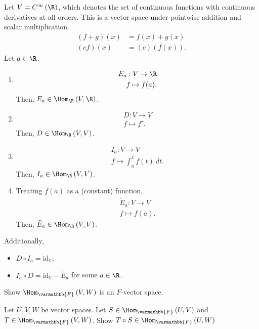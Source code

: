 \documentclass[10pt]{mypackage}
\renewcommand*{\mathbb}[1]{\varmathbb{#1}}
\begin{document}
\begin{example}
  Let $V = C^{\infty}\left(\R\right)$, which denotes the set of continuous functions with continuous derivatives at all orders. This is a vector space under pointwise addition and scalar multiplication.
  \begin{align*}
    (f+g)\left(x\right) &= f(x) + g(x)\\
    (cf)(x) &= (c)\left(f(x)\right).
  \end{align*}
  Let $a\in \R$.
  \begin{enumerate}[(1)]
    \item 
\begin{align*}
  E_a: V\rightarrow \R\\
  f \mapsto f(a).
\end{align*}
Then, $E_a \in \Hom_{\R}\left(V,\R\right)$.
\item
  \begin{align*}
    D: V\rightarrow V\\
    f\mapsto f'.
  \end{align*}
  Then, $D\in \Hom_{\R}\left(V,V\right)$.
\item 
  \begin{align*}
    I_a: V\rightarrow V\\
    f\mapsto \int_{a}^{x} f(t)\:dt.
  \end{align*}
  Then, $I_a\in \Hom_{\R}\left(V,V\right)$.
\item Treating $f(a)$ as a (constant) function,
  \begin{align*}
  \tilde{E}_a: V\rightarrow V\\
    f\mapsto f(a).
  \end{align*}
  Then, $\tilde{E}_{a}\in \Hom_{\R}\left(V,V\right)$.
  \end{enumerate}
  Additionally,
  \begin{itemize}
    \item $D\circ I_a = \text{id}_V$;
    \item $I_a\circ D = \text{id}_V - \tilde{E}_a$ for some $a\in \R$.
  \end{itemize}
\end{example}
\begin{exercise}
  Show $\Hom_{\mathbb{F}}\left(V,W\right)$ is an $F$-vector space.
\end{exercise}
\begin{exercise}
  Let $U,V,W$ be vector spaces. Let $S\in \Hom_{\mathbb{F}}\left(U,V\right)$ and $T\in \Hom_{\mathbb{F}}\left(V,W\right)$. Show $T\circ S \in \Hom_{\mathbb{F}}\left(U,W\right)$
\end{exercise}
\end{document}
